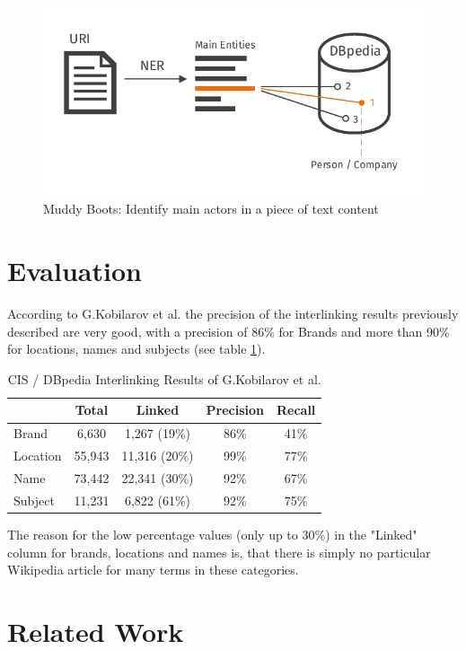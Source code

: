 \documentclass{llncs}
\begin{document}
\begin{figure}[!h]
  \includegraphics[width=\textwidth]{images/muddy_boots_dark}
  \caption{Muddy Boots: Identify main actors in a piece of text content}
  \label{fig:muddy}
\end{figure}

\section{Evaluation}

According to G.Kobilarov et al. \cite{mmsw} the precision of the interlinking results previously described are very good, with a precision of 86\% for Brands and more than 90\% for locations, names and subjects (see table \ref{tab:evaluation}).
\begin{table}
\centering
\begin{tabular}{lcccc}
  \hline
  \textbf{ } & \textbf{Total} & \textbf{Linked} & \textbf{Precision} & \textbf{Recall} \\
  \hline
  Brand & 6,630 & 1,267 (19\%) & 86\% & 41\% \\
  Location & 55,943 & 11,316 (20\%) & 99\% & 77\% \\
  Name & 73,442 & 22,341 (30\%) & 92\% & 67\% \\
  Subject & 11,231 & 6,822 (61\%) & 92\% & 75\% \\
  \hline
\end{tabular}
\caption{CIS / DBpedia Interlinking Results of G.Kobilarov et al. \cite{mmsw}}
\label{tab:evaluation}
\end{table}

The reason for the low percentage values (only up to 30\%) in the "Linked" column for brands, locations and names is, that there is simply no particular Wikipedia article for many terms in these categories.

\section{Related Work}
\end{document}
